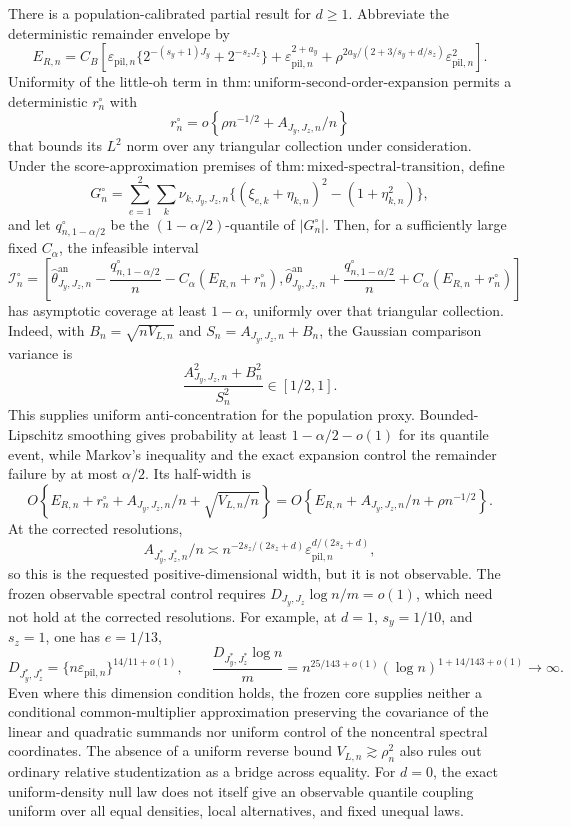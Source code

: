 There is a population-calibrated partial result for \(d\ge1\).  Abbreviate the deterministic remainder envelope by
\[
E_{R,n}=C_B\left[
\varepsilon_{\mathrm{pil},n}
\{2^{-(s_y+1)J_y}+2^{-s_zJ_z}\}
+\varepsilon_{\mathrm{pil},n}^{2+a_y}
+\rho^{2a_y/(2+3/s_y+d/s_z)}\varepsilon_{\mathrm{pil},n}^2
\right].
\]
Uniformity of the little-oh term in
\(\mathrm{thm{:}uniform\text{-}second\text{-}order\text{-}expansion}\)
permits a deterministic \(r_n^\circ\) with
\[
r_n^\circ=o\!\left\{\rho n^{-1/2}+A_{J_y,J_z,n}/n\right\}
\]
that bounds its \(L^2\) norm over any triangular collection under consideration.  Under the score-approximation premises of
\(\mathrm{thm{:}mixed\text{-}spectral\text{-}transition}\), define
\[
G_n^\circ=\sum_{e=1}^2\sum_k\nu_{k,J_y,J_z,n}
\{(\xi_{e,k}+\eta_{k,n})^2-(1+\eta_{k,n}^2)\},
\]
and let \(q_{n,1-\alpha/2}^\circ\) be the
\((1-\alpha/2)\)-quantile of \(|G_n^\circ|\).  Then, for a sufficiently large fixed \(C_\alpha\), the infeasible interval
\[
\mathcal I_n^\circ=
\left[
\widehat\theta^{\mathrm{an}}_{J_y,J_z,n}
-\frac{q_{n,1-\alpha/2}^\circ}{n}-C_\alpha(E_{R,n}+r_n^\circ),
\widehat\theta^{\mathrm{an}}_{J_y,J_z,n}
+\frac{q_{n,1-\alpha/2}^\circ}{n}+C_\alpha(E_{R,n}+r_n^\circ)
\right]
\]
has asymptotic coverage at least \(1-\alpha\), uniformly over that triangular collection.  Indeed, with
\(B_n=\sqrt{nV_{L,n}}\) and \(S_n=A_{J_y,J_z,n}+B_n\), the Gaussian comparison variance is
\[
\frac{A_{J_y,J_z,n}^2+B_n^2}{S_n^2}\in[1/2,1].
\]
This supplies uniform anti-concentration for the population proxy.  Bounded-Lipschitz smoothing gives probability at least
\(1-\alpha/2-o(1)\) for its quantile event, while Markov's inequality and the exact expansion control the remainder failure by at most \(\alpha/2\).  Its half-width is
\[
O\!\left\{
E_{R,n}+r_n^\circ+A_{J_y,J_z,n}/n+\sqrt{V_{L,n}/n}
\right\}
=O\!\left\{E_{R,n}+A_{J_y,J_z,n}/n+\rho n^{-1/2}\right\}.
\]
At the corrected resolutions,
\[
A_{J_y^*,J_z^*,n}/n
\asymp n^{-2s_z/(2s_z+d)}
\varepsilon_{\mathrm{pil},n}^{d/(2s_z+d)},
\]
so this is the requested positive-dimensional width, but it is not observable.  The frozen observable spectral control requires
\(D_{J_y,J_z}\log n/m=o(1)\), which need not hold at the corrected resolutions.  For example, at
\(d=1\), \(s_y=1/10\), and \(s_z=1\), one has
\(e=1/13\),
\[
D_{J_y^*,J_z^*}
=\{n\varepsilon_{\mathrm{pil},n}\}^{14/11+o(1)},
\qquad
\frac{D_{J_y^*,J_z^*}\log n}{m}
=n^{25/143+o(1)}(\log n)^{1+14/143+o(1)}\to\infty.
\]
Even where this dimension condition holds, the frozen core supplies neither a conditional common-multiplier approximation preserving the covariance of the linear and quadratic summands nor uniform control of the noncentral spectral coordinates.  The absence of a uniform reverse bound
\(V_{L,n}\gtrsim\rho_n^2\) also rules out ordinary relative studentization as a bridge across equality.  For \(d=0\), the exact uniform-density null law does not itself give an observable quantile coupling uniform over all equal densities, local alternatives, and fixed unequal laws.